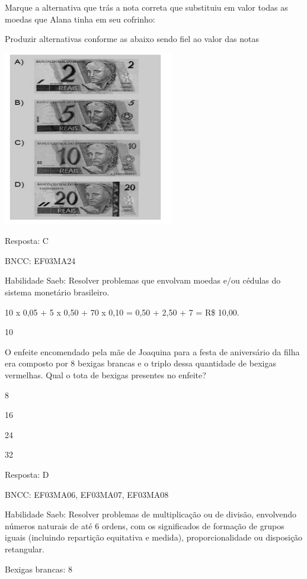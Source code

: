 \begin{escolha}
\begin{escolha}
Marque a alternativa que trás a nota correta que substituiu em valor
todas as moedas que Alana tinha em seu cofrinho:

Produzir alternativas conforme as abaixo sendo fiel ao valor das notas

\includegraphics[width=2.93590in,height=3.00930in]{media/image135.png}

Resposta: C

BNCC: EF03MA24

Habilidade Saeb: Resolver problemas que envolvam moedas e/ou cédulas do
sistema monetário brasileiro.

10 x 0,05 + 5 x 0,50 + 70 x 0,10 = 0,50 + 2,50 + 7 = R\$ 10,00.

\num{10}

O enfeite encomendado pela mãe de Joaquina para a festa de aniversário
da filha era composto por 8 bexigas brancas e o triplo dessa quantidade
de bexigas vermelhas. Qual o tota de bexigas presentes no enfeite?

\begin{escolha}

\item
  8
\item
  16
\item
  24
\item
  32
\end{escolha}

Resposta: D

BNCC: EF03MA06, EF03MA07, EF03MA08

Habilidade Saeb: Resolver problemas de multiplicação ou de divisão,
envolvendo números naturais de até 6 ordens, com os significados de
formação de grupos iguais (incluindo repartição equitativa e medida),
proporcionalidade ou disposição retangular.

Bexigas brancas: 8


\end{escolha}
\end{escolha}
